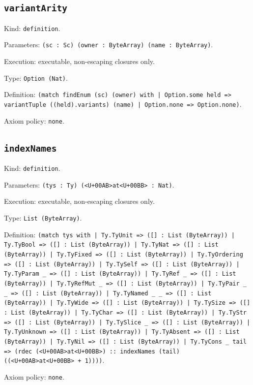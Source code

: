 \documentclass[11pt]{article}
\begin{document}
\subsection*{\texttt{variantArity}}
\noindent Kind: \texttt{definition}.\par
\noindent Parameters: \texttt{(sc : Sc) (owner : ByteArray) (name : ByteArray)}.\par
\noindent Execution: executable, non-escaping closures only.\par
\noindent Type: \texttt{Option (Nat)}.\par
\noindent Definition: \texttt{(match findEnum (sc) (owner) with | Option.some held => variantTuple ((held).variants) (name) | Option.none => Option.none)}.\par
\noindent Axiom policy: \texttt{none}.\par
\subsection*{\texttt{indexNames}}
\noindent Kind: \texttt{definition}.\par
\noindent Parameters: \texttt{(tys : Ty) (<U+00AB>at<U+00BB> : Nat)}.\par
\noindent Execution: executable, non-escaping closures only.\par
\noindent Type: \texttt{List (ByteArray)}.\par
\noindent Definition: \texttt{(match tys with | Ty.TyUnit => ([] : List (ByteArray)) | Ty.TyBool => ([] : List (ByteArray)) | Ty.TyNat => ([] : List (ByteArray)) | Ty.TyFixed => ([] : List (ByteArray)) | Ty.TyOrdering => ([] : List (ByteArray)) | Ty.TySelf => ([] : List (ByteArray)) | Ty.TyParam \_ => ([] : List (ByteArray)) | Ty.TyRef \_ => ([] : List (ByteArray)) | Ty.TyRefMut \_ => ([] : List (ByteArray)) | Ty.TyPair \_ \_ => ([] : List (ByteArray)) | Ty.TyNamed \_ \_ => ([] : List (ByteArray)) | Ty.TyWide => ([] : List (ByteArray)) | Ty.TySize => ([] : List (ByteArray)) | Ty.TyChar => ([] : List (ByteArray)) | Ty.TyStr => ([] : List (ByteArray)) | Ty.TySlice \_ => ([] : List (ByteArray)) | Ty.TyUnknown => ([] : List (ByteArray)) | Ty.TyAbsent => ([] : List (ByteArray)) | Ty.TyNil => ([] : List (ByteArray)) | Ty.TyCons \_ tail => (rdec (<U+00AB>at<U+00BB>) :: indexNames (tail) ((<U+00AB>at<U+00BB> + 1))))}.\par
\noindent Axiom policy: \texttt{none}.\par
\end{document}
